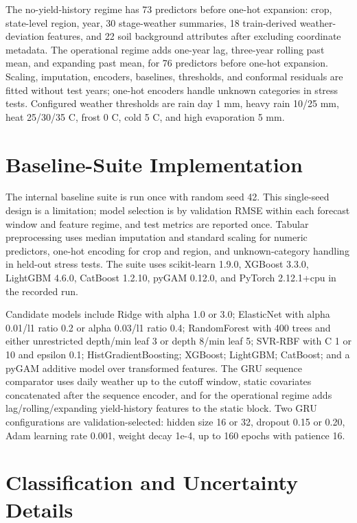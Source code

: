 \documentclass[wcp]{jmlr}
\begin{document}
The no-yield-history regime has 73 predictors before one-hot expansion: crop, state-level region, year, 30 stage-weather summaries, 18 train-derived weather-deviation features, and 22 soil background attributes after excluding coordinate metadata. The operational regime adds one-year lag, three-year rolling past mean, and expanding past mean, for 76 predictors before one-hot expansion. Scaling, imputation, encoders, baselines, thresholds, and conformal residuals are fitted without test years; one-hot encoders handle unknown categories in stress tests. Configured weather thresholds are rain day 1 mm, heavy rain 10/25 mm, heat 25/30/35 C, frost 0 C, cold 5 C, and high evaporation 5 mm.

\section{Baseline-Suite Implementation}

The internal baseline suite is run once with random seed 42. This single-seed design is a limitation; model selection is by validation RMSE within each forecast window and feature regime, and test metrics are reported once. Tabular preprocessing uses median imputation and standard scaling for numeric predictors, one-hot encoding for crop and region, and unknown-category handling in held-out stress tests. The suite uses scikit-learn 1.9.0, XGBoost 3.3.0, LightGBM 4.6.0, CatBoost 1.2.10, pyGAM 0.12.0, and PyTorch 2.12.1+cpu in the recorded run.

Candidate models include Ridge with alpha 1.0 or 3.0; ElasticNet with alpha 0.01/l1 ratio 0.2 or alpha 0.03/l1 ratio 0.4; RandomForest with 400 trees and either unrestricted depth/min leaf 3 or depth 8/min leaf 5; SVR-RBF with C 1 or 10 and epsilon 0.1; HistGradientBoosting; XGBoost; LightGBM; CatBoost; and a pyGAM additive model over transformed features. The GRU sequence comparator uses daily weather up to the cutoff window, static covariates concatenated after the sequence encoder, and for the operational regime adds lag/rolling/expanding yield-history features to the static block. Two GRU configurations are validation-selected: hidden size 16 or 32, dropout 0.15 or 0.20, Adam learning rate 0.001, weight decay 1e-4, up to 160 epochs with patience 16.

\section{Classification and Uncertainty Details}
\end{document}
